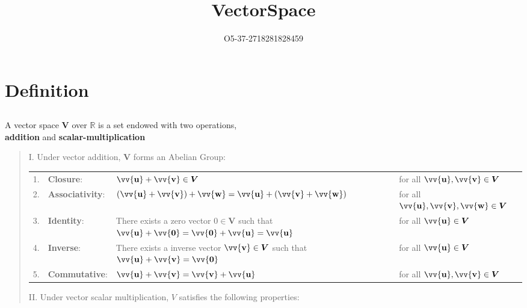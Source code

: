 \documentclass[11pt]{article}
\title{VectorSpace}
\author{O5-37-2718281828459}
\DeclareRobustCommand{\myvec}[1]{\vv{\mathbf{#1}}}
\begin{document}
    \section{Definition}
    \subsection{}
    {
        \newcommand{\myV}{\bm{V}}

        A vector space $\myV$ over $\mathbb{R}$ is a set endowed with two operations, \\
        \textbf{addition} and \textbf{scalar-multiplication}
        
        \begin{quote}
            
            I. Under vector addition, $\myV$ forms an Abelian Group:
    
            \renewcommand{\arraystretch}{2.5}
            \begin{tabular}{l l l l @{}}
                \hline
                1. & \textbf{Closure}:       & $\myvec{u} + \myvec{v} \in \myV$                                                     & for all $\myvec{u}, \myvec{v} \in \myV$ \\
                2. & \textbf{Associativity}: & $(\myvec{u} + \myvec{v}) + \myvec{w} = \myvec{u} + (\myvec{v} + \myvec{w})$           & for all $\myvec{u}, \myvec{v}, \myvec{w} \in \myV$ \\
                3. & \textbf{Identity}:      & \makecell[l]{There exists a zero vector $0 \in \myV$\\ such that $\myvec{u} + \myvec{0} = \myvec{0} + \myvec{u} = \myvec{u}$} & for all $\myvec{u} \in \myV$ \\
                4. & \textbf{Inverse}:       & \makecell[l]{There exists a inverse vector $\myvec{v} \in \myV$\\ such that $\myvec{u} + \myvec{v} = \myvec{0}$}             & for all $\myvec{u} \in \myV$ \\
                5. & \textbf{Commutative}:   & $\myvec{u} + \myvec{v} = \myvec{v} + \myvec{u}$                                       & for all $\myvec{u},\myvec{v} \in \myV$ \\
                \hline
            \end{tabular} 
            \vspace*{\belowdisplayskip}
    
            \noindent
            II. Under vector scalar multiplication, $V$ satisfies the following properties:
            

\end{quote}}
\end{document}
